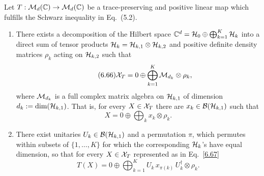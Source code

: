 \documentclass[11pt,a4paper]{article}
\theoremstyle{plain}
\theoremstyle{definition}
\theoremstyle{remark}
\begin{document}
\begin{theorem}
    Let $T:\mathcal{M}_d(\mathbb{C})\to\mathcal{M}_d(\mathbb{C})$ be a trace-preserving and positive linear map
    which fulfills the Schwarz inequality in Eq.~(5.2).
    \begin{enumerate}
        \item There exists a decomposition of the Hilbert space
              $\mathbb{C}^d=\mathcal{H}_0\oplus \bigoplus_{k=1}^K \mathcal{H}_k$ into a direct sum of tensor products
              $\mathcal{H}_k=\mathcal{H}_{k,1}\otimes \mathcal{H}_{k,2}$ and positive definite density matrices
              $\rho_k$ acting on $\mathcal{H}_{k,2}$ such that
              \begin{equation}\tag{6.66}
                  \mathcal{X}_T = 0 \oplus \bigoplus_{k=1}^K \mathcal{M}_{d_k}\otimes \rho_k,
              \end{equation}
              where $\mathcal{M}_{d_k}$ is a full complex matrix algebra on $\mathcal{H}_{k,1}$ of dimension
              $d_k:=\dim(\mathcal{H}_{k,1})$. That is, for every $X\in\mathcal{X}_T$ there are
              $x_k\in\mathcal{B}(\mathcal{H}_{k,1})$ such that
              \begin{equation}\tag{6.67}
                  X = 0 \oplus \bigoplus_k x_k\otimes \rho_k.
              \end{equation}
        \item There exist unitaries $U_k\in\mathcal{B}(\mathcal{H}_{k,1})$ and a permutation $\pi$,
              which permutes within subsets of $\{1,\dots,K\}$ for which the corresponding
              $\mathcal{H}_k$'s have equal dimension, so that for every $X\in\mathcal{X}_T$ represented as in
              Eq.~\eqref{6.67}
              \begin{equation}\tag{6.68}
                  T(X)
                  = 0 \oplus \bigoplus_{k=1}^K
                  U_k\,x_{\pi(k)}\,U_k^\dagger \otimes \rho_k.
              \end{equation}
    \end{enumerate}
\end{theorem}
\end{document}
